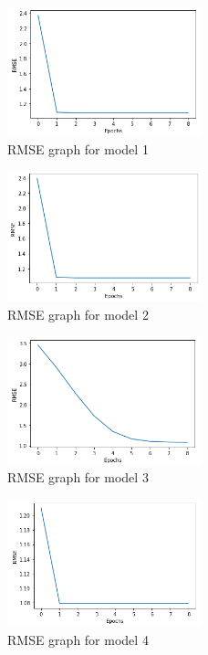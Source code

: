 \documentclass[final]{cvpr}
\begin{document}
\begin{figure}
	\includegraphics[width=0.5\textwidth]{screenshot20210415234153.png}
	\caption{RMSE graph for model 1}
\end{figure}

\begin{figure}
	\includegraphics[width=0.5\textwidth]{screenshot20210415234346.png}
	\caption{RMSE graph for model 2}
\end{figure}

\begin{figure}
	\includegraphics[width=0.5\textwidth]{screenshot20210415234450.png}
	\caption{RMSE graph for model 3}
\end{figure}

\begin{figure}
	\includegraphics[width=0.5\textwidth]{screenshot20210415234538.png}
	\caption{RMSE graph for model 4}
\end{figure}
\end{document}
